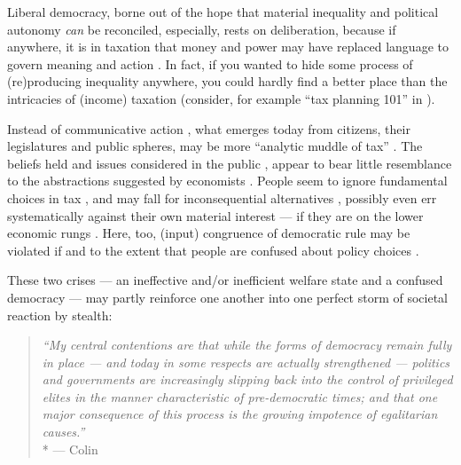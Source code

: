 

Liberal democracy, borne out of the hope that material inequality and political autonomy \emph{can} be reconciled, %
especially, rests on deliberation, because if anywhere, it is in taxation that money and power may have replaced language to govern meaning and action \citep{Habermas-1971}.
In fact, if you wanted to hide some process of (re)producing inequality anywhere, you could hardly find a better place than the intricacies of (income) taxation (consider, for example ``tax planning 101'' in \citealt[888]{McCaffery2005}).

Instead of communicative action \citep{Habermas-1984}, what emerges today from citizens, their legislatures and public spheres, may be more ``analytic muddle of tax'' \citep[862]{McCaffery2005}.
The beliefs held and issues considered in the public \citep[for example,][]{Caplan2007}, appear to bear little resemblance to the abstractions suggested by economists \cite[for example,][]{Harberger1974}.
People seem to ignore fundamental choices in tax \citep[for example,][]{McCafferyHines2010}, and may fall for inconsequential alternatives \citep[for example,][]{SausgruberTyran2011}, possibly even err systematically against their own material interest --- if they are on the lower economic rungs \citep[for a German example,][]{Kemmerling2009}.
Here, too, (input) congruence of democratic rule may be violated if and to the extent that people are confused about policy choices \citep[compare][90]{Zurn-2000-aa}.

These two crises --- an ineffective and/or inefficient welfare state and a confused democracy --- may partly reinforce one another into one perfect storm of societal reaction by stealth:
\begin{quote}
	\emph{
	``My central contentions are that while the forms of democracy remain fully in place --- and today in some respects are actually strengthened --- politics and governments are increasingly slipping back into the control of privileged elites in the manner characteristic of pre-democratic times;
	and that one major consequence of this process is the growing impotence of egalitarian causes.''}
	\\*
	--- Colin \citet[6]{Crouch2004}
\end{quote}

